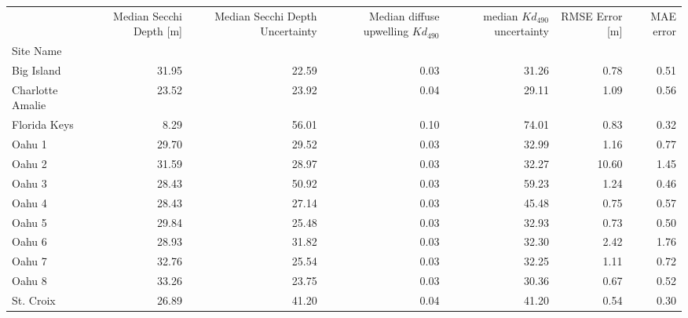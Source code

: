 \begin{tabular}{lrrrrrr}
\toprule
{} &  Median Secchi Depth [m] &  Median Secchi Depth Uncertainty &  Median diffuse upwelling $Kd_{490}$ &  median $Kd_{490}$ uncertainty &  RMSE Error [m] &  MAE error \\
Site Name        &                          &                                  &                                      &                                &                 &            \\
\midrule
Big Island       &                    31.95 &                            22.59 &                                 0.03 &                          31.26 &            0.78 &       0.51 \\
Charlotte Amalie &                    23.52 &                            23.92 &                                 0.04 &                          29.11 &            1.09 &       0.56 \\
Florida Keys     &                     8.29 &                            56.01 &                                 0.10 &                          74.01 &            0.83 &       0.32 \\
Oahu 1           &                    29.70 &                            29.52 &                                 0.03 &                          32.99 &            1.16 &       0.77 \\
Oahu 2           &                    31.59 &                            28.97 &                                 0.03 &                          32.27 &           10.60 &       1.45 \\
Oahu 3           &                    28.43 &                            50.92 &                                 0.03 &                          59.23 &            1.24 &       0.46 \\
Oahu 4           &                    28.43 &                            27.14 &                                 0.03 &                          45.48 &            0.75 &       0.57 \\
Oahu 5           &                    29.84 &                            25.48 &                                 0.03 &                          32.93 &            0.73 &       0.50 \\
Oahu 6           &                    28.93 &                            31.82 &                                 0.03 &                          32.30 &            2.42 &       1.76 \\
Oahu 7           &                    32.76 &                            25.54 &                                 0.03 &                          32.25 &            1.11 &       0.72 \\
Oahu 8           &                    33.26 &                            23.75 &                                 0.03 &                          30.36 &            0.67 &       0.52 \\
St. Croix        &                    26.89 &                            41.20 &                                 0.04 &                          41.20 &            0.54 &       0.30 \\
\bottomrule
\end{tabular}
